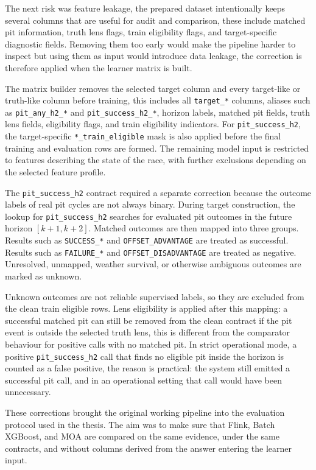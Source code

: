 The next risk was feature leakage, the prepared dataset intentionally keeps several columns that are useful for audit and comparison, these include matched pit information,
truth lens flags, train eligibility flags, and target-specific diagnostic fields. Removing them too early would make the pipeline harder to inspect but using them as input would
introduce data leakage, the correction is therefore applied when the learner matrix is built.

The matrix builder removes the selected target column and every target-like or truth-like column before training, this includes all \texttt{target\_*} columns, aliases such as
\texttt{pit\_any\_h2\_*} and \texttt{pit\_success\_h2\_*}, horizon labels, matched pit fields, truth lens fields, eligibility flags, and train eligibility indicators. For
\texttt{pit\_success\_h2}, the target-specific \texttt{*\_train\_eligible} mask is also applied before the final training and evaluation rows are formed. The remaining model
input is restricted to features describing the state of the race, with further exclusions depending on the selected feature profile.

The \texttt{pit\_success\_h2} contract required a separate correction because the outcome labels of real pit cycles are not always binary. During target construction, the lookup
for \texttt{pit\_success\_h2} searches for evaluated pit outcomes in the future horizon $[k+1,k+2]$. Matched outcomes are then mapped into three groups. Results such as
\texttt{SUCCESS\_*} and \texttt{OFFSET\_ADVANTAGE} are treated as successful. Results such as \texttt{FAILURE\_*} and \texttt{OFFSET\_DISADVANTAGE} are treated as negative.
Unresolved, unmapped, weather survival, or otherwise ambiguous outcomes are marked as unknown.

Unknown outcomes are not reliable supervised labels, so they are excluded from the clean train eligible rows. Lens eligibility is applied after this mapping: a successful
matched pit can still be removed from the clean contract if the pit event is outside the selected truth lens, this is different from the comparator behaviour for positive calls
with no matched pit. In strict operational mode, a positive \texttt{pit\_success\_h2} call that finds no eligible pit inside the horizon is counted as a false positive, the reason
is practical: the system still emitted a successful pit call, and in an operational setting that call would have been unnecessary.

These corrections brought the original working pipeline into the evaluation protocol used in the thesis.
The aim was to make sure that Flink, Batch XGBoost, and MOA are compared on the same evidence, under the same contracts, and without columns derived from the answer entering the
learner input.


